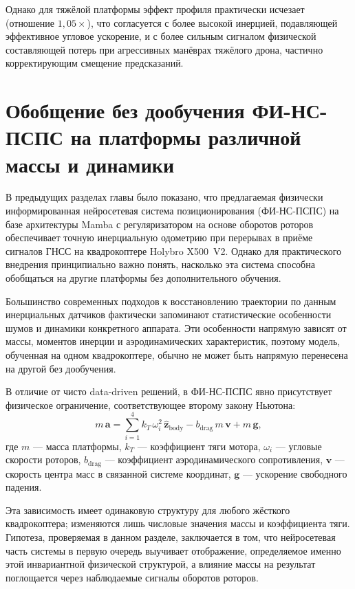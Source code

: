Однако для тяжёлой платформы эффект профиля практически исчезает (отношение $1{,}05\times$), что согласуется с более высокой инерцией, подавляющей эффективное угловое ускорение, и с более сильным сигналом физической составляющей потерь при агрессивных манёврах тяжёлого дрона, частично корректирующим смещение предсказаний.
	
\section{Обобщение без дообучения ФИ-НС-ПСПС на платформы различной массы и динамики}
\label{sec:mp_crossplatform}

В предыдущих разделах главы было показано, что предлагаемая физически информированная нейросетевая система позиционирования (ФИ-НС-ПСПС) на базе архитектуры Mamba с регуляризатором на основе оборотов роторов обеспечивает точную инерциальную одометрию при перерывах в приёме сигналов ГНСС на квадрокоптере Holybro X500~V2. Однако для практического внедрения принципиально важно понять, насколько эта система способна обобщаться на другие платформы без дополнительного обучения. 

Большинство современных подходов к восстановлению траектории по данным инерциальных датчиков фактически запоминают статистические особенности шумов и динамики конкретного аппарата. Эти особенности напрямую зависят от массы, моментов инерции и аэродинамических характеристик, поэтому модель, обученная на одном квадрокоптере, обычно не может быть напрямую перенесена на другой без дообучения. 

В отличие от чисто data-driven решений, в ФИ-НС-ПСПС явно присутствует физическое ограничение, соответствующее второму закону Ньютона:
\begin{equation}
	m\,\mathbf{a} =
	\sum_{i=1}^{4} k_T\,\omega_i^2\,\hat{\mathbf{z}}_{\mathrm{body}}
	- b_{\mathrm{drag}}\,m\,\mathbf{v}
	+ m\,\mathbf{g},
	\label{eq:newton_full}
\end{equation}
где $m$ — масса платформы, $k_T$ — коэффициент тяги мотора, $\omega_i$ — угловые скорости роторов, $b_{\mathrm{drag}}$ — коэффициент аэродинамического сопротивления, $\mathbf{v}$ — скорость центра масс в связанной системе координат, $\mathbf{g}$ — ускорение свободного падения. 

Эта зависимость имеет одинаковую структуру для любого жёсткого квадрокоптера; изменяются лишь числовые значения массы и коэффициента тяги. Гипотеза, проверяемая в данном разделе, заключается в том, что нейросетевая часть системы в первую очередь выучивает отображение, определяемое именно этой инвариантной физической структурой, а влияние массы на результат поглощается через наблюдаемые сигналы оборотов роторов.

